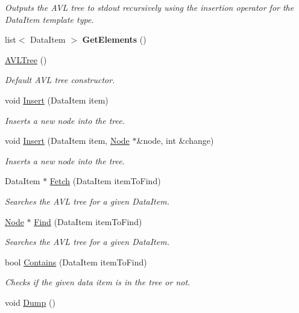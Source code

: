 \begin{DoxyCompactItemize}
\begin{DoxyCompactList}\small\item\em Outputs the A\-V\-L tree to stdout recursively using the insertion operator for the Data\-Item template type. \end{DoxyCompactList}\item 
\hypertarget{classAVLTree_a501149b97428fd09771c4dffc2d5d932}{list$<$ Data\-Item $>$ {\bfseries Get\-Elements} ()}\label{classAVLTree_a501149b97428fd09771c4dffc2d5d932}

\item 
\hyperlink{classAVLTree_a685459c83f9879c6c99687cd620033cc}{A\-V\-L\-Tree} ()
\begin{DoxyCompactList}\small\item\em Default A\-V\-L tree constructor. \end{DoxyCompactList}\item 
void \hyperlink{classAVLTree_a19150bcba8501c6ae6fb2b519ad64b05}{Insert} (Data\-Item item)
\begin{DoxyCompactList}\small\item\em Inserts a new node into the tree. \end{DoxyCompactList}\item 
void \hyperlink{classAVLTree_a7d45f6097e6f9f696ed80b80c8a88722}{Insert} (Data\-Item item, \hyperlink{structAVLTree_1_1Node}{Node} $\ast$\&node, int \&change)
\begin{DoxyCompactList}\small\item\em Inserts a new node into the tree. \end{DoxyCompactList}\item 
Data\-Item $\ast$ \hyperlink{classAVLTree_a8c1cdcd4e4be5f0feb9b2bad5ef08b08}{Fetch} (Data\-Item item\-To\-Find)
\begin{DoxyCompactList}\small\item\em Searches the A\-V\-L tree for a given Data\-Item. \end{DoxyCompactList}\item 
\hyperlink{structAVLTree_1_1Node}{Node} $\ast$ \hyperlink{classAVLTree_a88e4e21a384e6dc4d9be64bfd26e642e}{Find} (Data\-Item item\-To\-Find)
\begin{DoxyCompactList}\small\item\em Searches the A\-V\-L tree for a given Data\-Item. \end{DoxyCompactList}\item 
bool \hyperlink{classAVLTree_af87b660c0c905507b3210abeecff8f8f}{Contains} (Data\-Item item\-To\-Find)
\begin{DoxyCompactList}\small\item\em Checks if the given data item is in the tree or not. \end{DoxyCompactList}\item 
\hypertarget{classAVLTree_a04db67e206a1d00093ae74a6506dcf59}{void \hyperlink{classAVLTree_a04db67e206a1d00093ae74a6506dcf59}{Dump} ()}\label{classAVLTree_a04db67e206a1d00093ae74a6506dcf59}


\end{DoxyCompactItemize}
